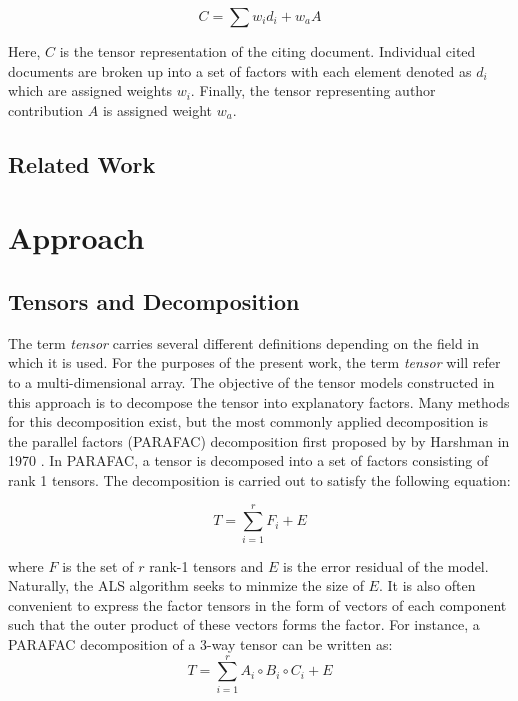 \documentclass{article}
\begin{document}
\begin{equation}
    \label{eq:model}
    C = \sum w_id_i + w_a A
\end{equation}

Here, $C$ is the tensor representation of the citing document.
Individual cited documents are broken up into a set of factors with
each element denoted as $d_i$ which are assigned weights $w_i$.  Finally,
the tensor representing author contribution $A$ is assigned weight
$w_a$.  

\subsection{Related Work}

\section{Approach}
\subsection{Tensors and Decomposition}
The term {\em tensor} carries several different definitions depending
on the field in which it is used.  For the purposes of the present
work, the term {\em tensor} will refer to a multi-dimensional array.
The objective of the tensor models constructed in this approach is to
decompose the tensor into explanatory factors.  Many methods for this
decomposition exist, but the most commonly applied decomposition is
the parallel factors (PARAFAC) decomposition first proposed by by
Harshman in 1970 \cite{harshman1970}.  In PARAFAC, a tensor is
decomposed into a set of factors consisting of rank 1 tensors.  The
decomposition is carried out to satisfy the following equation:

\begin{equation}
    \label{eq:parafac}
    T = \displaystyle\sum_{i=1}^{r} F_i + E
\end{equation}

where $F$ is the set of $r$ rank-1 tensors and $E$ is the error
residual of the model.  Naturally, the ALS algorithm seeks to minmize
the size of $E$.  It is also often convenient to express the factor
tensors in the form of vectors of each component such that the outer
product of these vectors forms the factor.  For instance,
a PARAFAC decomposition of a 3-way tensor can be written as:
\begin{equation}
    \label{eq:parafac-comp}
    T = \displaystyle\sum_{i=1}^{r} A_i \circ B_i \circ C_i + E
\end{equation}
\end{document}
